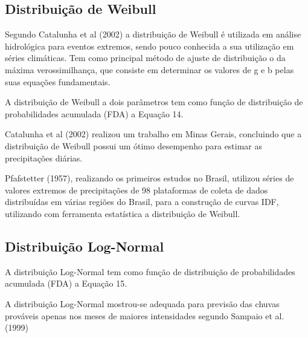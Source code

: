 \subsection{Distribuição de Weibull}

Segundo Catalunha et al (2002) a distribuição de Weibull é utilizada em análise hidrológica para eventos extremos, sendo pouco conhecida a sua utilização em séries climáticas. Tem como principal método de ajuste de distribuição o da máxima verossimilhança, que consiste em determinar os valores de g e b pelas suas equações fundamentais.

A distribuição de Weibull a dois parâmetros tem como função de distribuição de probabilidades acumulada (FDA) a Equação 14.

Catalunha et al (2002) realizou um trabalho em Minas Gerais, concluindo que a distribuição de Weibull possui um ótimo desempenho para estimar as precipitações diárias.

Pfafstetter (1957), realizando os primeiros estudos no Brasil, utilizou séries de valores extremos de precipitações de 98 plataformas de coleta de dados distribuídas em várias regiões do Brasil, para a construção de curvas IDF, utilizando com ferramenta estatística a distribuição de Weibull.

\subsection{Distribuição Log-Normal}

A distribuição Log-Normal tem como função de distribuição de probabilidades acumulada (FDA) a Equação 15.

A distribuição Log-Normal mostrou-se adequada para previsão das chuvas prováveis apenas nos meses de maiores intensidades segundo Sampaio et al. (1999)